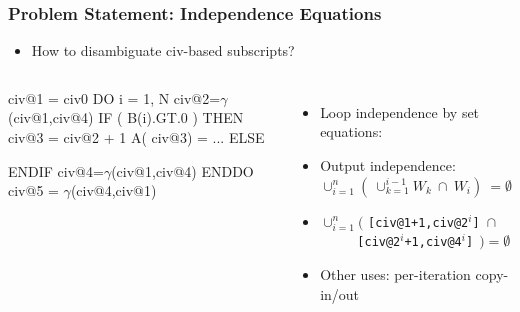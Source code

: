 \documentclass{beamer}
\newcommand{\emp}[1]{\textcolor{DikuRed}{ #1}}
\newcommand{\emphh}[1]{\textcolor{CosGreen}{ #1}}
\newcommand{\mymath}[1]{$ #1 $}
\newcommand{\myindx}[1]{_{#1}}
\newcommand{\myindu}[1]{^{#1}}
\begin{document}
\begin{frame}[fragile,t]
  \frametitle{Problem Statement: Independence Equations}

\begin{itemize}
    \item[\emp{3}] \emp{How to disambiguate {\sc civ}-based subscripts?}
\end{itemize}


\begin{columns}
\begin{colorcode}[fontsize=\small]
\emp{civ@1 = civ0}
DO i = 1, N
  \emp{civ@2=\mymath{\gamma}(civ@1,civ@4)}
  IF ( B(i).GT.0 ) THEN
    \emp{civ@3 = civ@2 + 1}
    A(\emphh{civ@3}) = ...
  ELSE

  ENDIF
  \emp{civ@4=\mymath{\gamma}(civ@1,civ@4)}
ENDDO
\emp{civ@5 = \mymath{\gamma}(civ@4,civ@1)}
\end{colorcode}
\begin{itemize}
    \item[1] Loop independence by set equations:\smallskip
    \item Output independence: $\cup_{i=1}^{n}(\ \cup_{k=1}^{i-1}W_k \ \cap \ W_i ) \ = \emptyset$\smallskip\pause
    \item $\cup_{i=1}^{n}($ {\tt[civ@1+1,civ@2$^{i}$] $\cap$}\\
          $\mbox{~~~~~~~~}${\tt[civ@2$^{i}$+1,civ@4$^{i}$]$~~) = \emptyset$}\bigskip
    \item[2] Other uses: per-iteration copy-in/out
\end{itemize}
\end{columns}
\bigskip
\bigskip

\end{frame}
\end{document}
